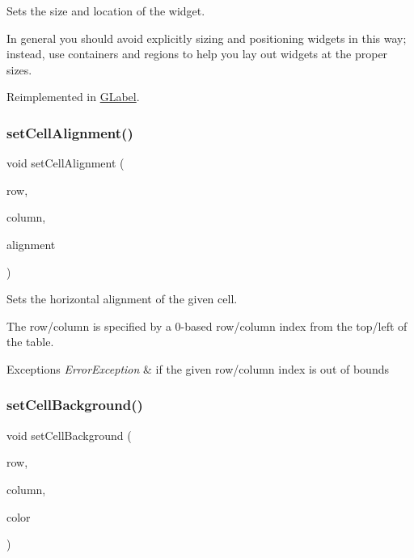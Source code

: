 Sets the size and location of the widget. 

In general you should avoid explicitly sizing and positioning widgets in this way; instead, use containers and regions to help you lay out widgets at the proper sizes. 

Reimplemented in \mbox{\hyperlink{classGLabel_adb836652705fdc4b7e90b7a3afc56a37}{G\+Label}}.

\mbox{\label{classGTable_a0c1ff398e920da7356b8375b66b9b083}} 
\subsubsection{\texorpdfstring{set\+Cell\+Alignment()}{setCellAlignment()}}
{\footnotesize\ttfamily void set\+Cell\+Alignment (\begin{DoxyParamCaption}\item[{int}]{row,  }\item[{int}]{column,  }\item[{Horizontal\+Alignment}]{alignment }\end{DoxyParamCaption})\hspace{0.3cm}{\ttfamily [virtual]}}



Sets the horizontal alignment of the given cell. 

The row/column is specified by a 0-\/based row/column index from the top/left of the table. 
\begin{DoxyExceptions}{Exceptions}
{\em Error\+Exception} & if the given row/column index is out of bounds \\
\hline
\end{DoxyExceptions}
\mbox{\label{classGTable_a50940b22e500a861451bbff938c8f50b}} 
\subsubsection{\texorpdfstring{set\+Cell\+Background()}{setCellBackground()}\hspace{0.1cm}{\footnotesize\ttfamily [1/2]}}
{\footnotesize\ttfamily void set\+Cell\+Background (\begin{DoxyParamCaption}\item[{int}]{row,  }\item[{int}]{column,  }\item[{int}]{color }\end{DoxyParamCaption})\hspace{0.3cm}{\ttfamily [virtual]}}



